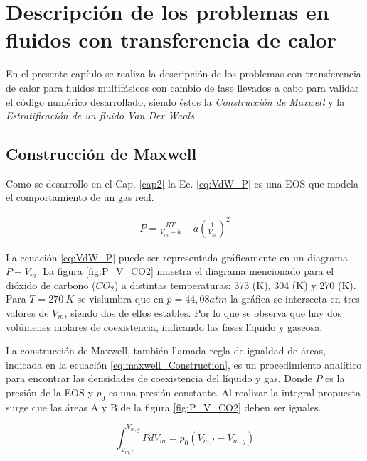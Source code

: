 \chapter{Descripción de los problemas en fluidos con transferencia de calor }
\graphicspath{{figs/cap4/}}
\label{cap4}

En el presente capíulo se realiza la descripción de los problemas con transferencia de calor para fluidos multifásicos con cambio de fase llevados a cabo para validar el código numérico desarrollado, siendo éstos la \textit{Construcción de Maxwell} y la \textit{Estratificación de un fluido Van Der Waals}

\section{Construcción de Maxwell}

Como se desarrollo en el Cap. \ref{cap2} la Ec. \ref{eq:VdW_P} es una EOS que modela el comportamiento de un gas real.

\begin{align*}
	P = \frac{R T}{V_m - b} - a {(\frac{1}{V_m})}^2
\end{align*}

La ecuación \ref{eq:VdW_P} puede ser representada gráficamente en un diagrama $P - V_m$. La figura \ref{fig:P_V_CO2} muestra el diagrama mencionado para el dióxido de carbono ($CO_2$) a distintas temperaturas: 373 (K), 304 (K) y 270 (K). Para $T = 270 \> K$ se vislumbra que en $p = 44,08 atm$ la gráfica se intersecta en tres valores de $V_m$, siendo dos de ellos estables. Por lo que se observa que hay dos volúmenes molares de coexistencia, indicando las fases líquido y gaseosa.

La construcción de Maxwell, también llamada regla de igualdad de áreas, indicada en la ecuación \ref{eq:maxwell_Construction}, es un procedimiento analítico para encontrar las densidades de coexistencia del líquido y gas. Donde $P$ es la presión de la EOS y $p_0$ es una presión constante. Al realizar la integral propuesta surge que las áreas A y B de la figura \ref{fig:P_V_CO2} deben ser iguales.

\begin{equation}
\int_{V_{m,l}}^{V_{m,g}} P d V_m = p_0 (V_{m,l} -  V_{m,g})
\label{eq:maxwell_Construction}
\end{equation}

